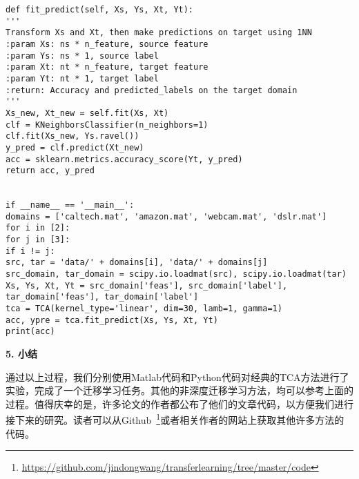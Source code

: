 \begin{lstlisting}[title=TCA方法的Matlab实现, frame=shadowbox]
def fit_predict(self, Xs, Ys, Xt, Yt):
'''
Transform Xs and Xt, then make predictions on target using 1NN
:param Xs: ns * n_feature, source feature
:param Ys: ns * 1, source label
:param Xt: nt * n_feature, target feature
:param Yt: nt * 1, target label
:return: Accuracy and predicted_labels on the target domain
'''
Xs_new, Xt_new = self.fit(Xs, Xt)
clf = KNeighborsClassifier(n_neighbors=1)
clf.fit(Xs_new, Ys.ravel())
y_pred = clf.predict(Xt_new)
acc = sklearn.metrics.accuracy_score(Yt, y_pred)
return acc, y_pred


if __name__ == '__main__':
domains = ['caltech.mat', 'amazon.mat', 'webcam.mat', 'dslr.mat']
for i in [2]:
for j in [3]:
if i != j:
src, tar = 'data/' + domains[i], 'data/' + domains[j]
src_domain, tar_domain = scipy.io.loadmat(src), scipy.io.loadmat(tar)
Xs, Ys, Xt, Yt = src_domain['feas'], src_domain['label'], tar_domain['feas'], tar_domain['label']
tca = TCA(kernel_type='linear', dim=30, lamb=1, gamma=1)
acc, ypre = tca.fit_predict(Xs, Ys, Xt, Yt)
print(acc)

\end{lstlisting}

\textbf{5. 小结}

通过以上过程，我们分别使用Matlab代码和Python代码对经典的TCA方法进行了实验，完成了一个迁移学习任务。其他的非深度迁移学习方法，均可以参考上面的过程。值得庆幸的是，许多论文的作者都公布了他们的文章代码，以方便我们进行接下来的研究。读者可以从Github~\footnote{\url{https://github.com/jindongwang/transferlearning/tree/master/code}}或者相关作者的网站上获取其他许多方法的代码。

%
%
